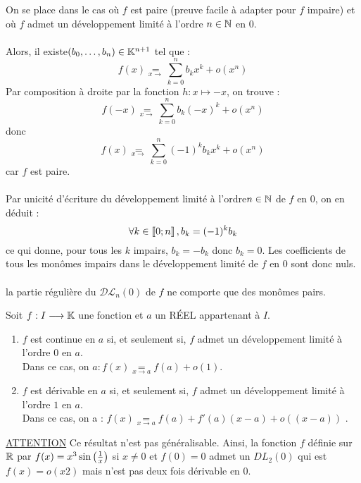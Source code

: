 \begin{dem}
    On se place dans le cas où \(f\) est paire (preuve facile à adapter pour \(f\) impaire) et où \(f\) admet un développement limité à l’ordre \(n \in \mathbb{N}\) en \(0\).\\~\\
    Alors, il existe\((b_0, \dots , b_n) \in \mathbb{K}^{n+1}\) tel que :
    \[f (x) \underset{x \to}{=} \sum^{n}_{k=0} b_kx^k + o (x^n)\]
    Par composition à droite par la fonction \(h : x \mapsto -x\), on trouve :
    \[f (-x) \underset{x \to}{=} \sum^n_{k=0} b_k(-x)^k + o (x^n)\]
        donc
    \[f (x) \underset{x \to}{=}\sum^n_{k=0}(-1)^kb_kx^k + o (x^n)\]
    car \(f\) est paire.\\~\\
    Par unicité d’écriture du développement limité à l’ordre\( n \in \mathbb{N}\) de \(f\) en \(0\), on en déduit :
    \[\forall k \in \left\llbracket0;n\right\rrbracket , b_k = (-1)^kb_k\]
    ce qui donne, pour tous les \(k\) impairs, \(b_k = -b_k\) donc \(b_k = 0\). Les coefficients de tous les monômes impairs dans le développement limité de \(f\) en \(0\) sont donc nuls.\\~\\
    \conclusion la partie régulière du \(\mathcal{DL}_n(0)\) de \(f\) ne comporte que des monômes pairs.
\end{dem}

\begin{defprop}
    Soit \(f : I \longrightarrow  \mathbb{K}\) une fonction et \(a\) un RÉEL appartenant à \(I\).
    \begin{enumerate}
    \item \(f\) est continue en \(a\) si, et seulement si, \(f\) admet un développement limité à l’ordre \(0\) en \(a\).\\
        Dans ce cas, on \(a : f (x) \underset{x\to a}{=} f (a) + o(1)\).
    \item \(f\) est dérivable en \(a\) si, et seulement si, \(f\) admet un développement limité à l’ordre \(1\) en \(a\).\\
        Dans ce cas, on a : \(f (x) \underset{x\to a}{=} f (a) + f '(a)(x - a) + o ((x - a))\) .
    \end{enumerate}
    \underline{ATTENTION}
Ce résultat n’est pas généralisable. Ainsi, la fonction \(f\) définie sur \(\mathbb{R}\) par \(f (x) = x^3 \sin\left(\frac{1}{x}\right)\) si \(x\neq 0\) et \(f (0) = 0\) admet un \(DL_2(0)\) qui est \(f (x) = o(x2)\) mais n’est pas deux fois dérivable en \(0\).
\end{defprop}

